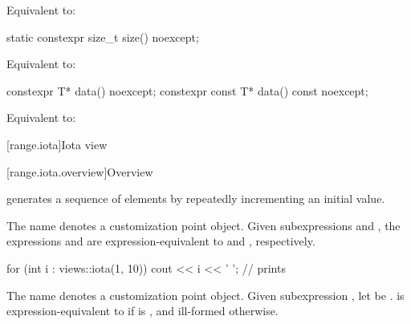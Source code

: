 \begin{itemdescr}
\pnum
\effects
Equivalent to: 
\end{itemdescr}

%
\begin{itemdecl}
static constexpr size_t size() noexcept;
\end{itemdecl}

\begin{itemdescr}
\pnum
\effects
Equivalent to: 
\end{itemdescr}

%
\begin{itemdecl}
constexpr T* data() noexcept;
constexpr const T* data() const noexcept;
\end{itemdecl}

\begin{itemdescr}
\pnum
\effects
Equivalent to: 
\end{itemdescr}

[range.iota]{Iota view}

[range.iota.overview]{Overview}

\pnum
{} generates a
sequence of elements by repeatedly incrementing an initial value.

\pnum
{}%
The name  denotes a
customization point object.
Given subexpressions  and , the expressions
 and 
are expression-equivalent to
 and ,
respectively.

\pnum
\begin{example}
\begin{codeblock}
for (int i : views::iota(1, 10))
  cout << i << ' '; // prints 
\end{codeblock}
\end{example}

\pnum
{}%
The name  denotes a
customization point object.
Given subexpression ,
let  be .
 is expression-equivalent to
if  is ,
and ill-formed otherwise.


